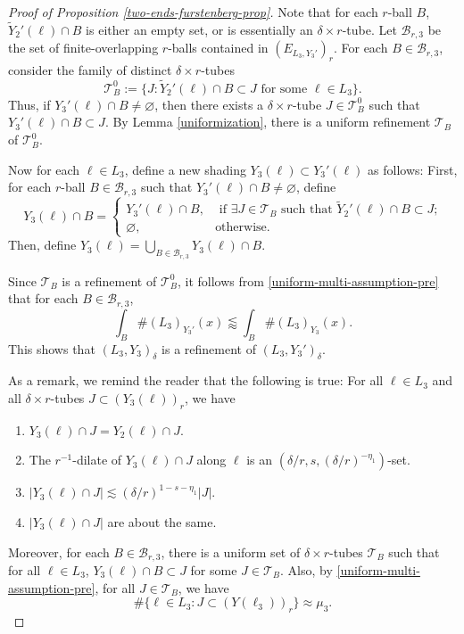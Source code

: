 \documentclass{amsart}
\numberwithin{equation}{section}
\newcommand{\de}{\delta}
\newcommand{\cb}{\mathcal B}
\newcommand{\cT}{{\mathcal T}}
\begin{document}
\begin{proof}[Proof of Proposition \ref{two-ends-furstenberg-prop}]
\smallskip

Note that for each $r$-ball $B$, $\tilde Y_2'(\ell)\cap B$ is either an empty set, or is essentially an $\de\times r$-tube.
Let $\cb_{r,3}$ be the set of finite-overlapping $r$-balls contained in $(E_{L_3, Y_3'})_r$.  
For each $B\in\cb_{r,3}$, consider the family of distinct  $\de\times r$-tubes 
\begin{equation}
    \cT_B^0:=\{J: \tilde Y_2'(\ell)\cap B\subset J\text{ for some $\ell\in L_3$}\}.
\end{equation}
Thus, if $Y_3'(\ell)\cap B\not=\varnothing$, then there exists a $\de\times r$-tube $J\in\cT_B^0$ such that $Y_3'(\ell)\cap B\subset J$.
By Lemma \ref{uniformization}, there is a uniform refinement $\cT_B$ of $\cT_B^0$. 


Now for each $\ell\in L_3$, define a new shading $Y_3(\ell)\subset Y_3'(\ell)$ as follows: 
First, for each $r$-ball $B\in\cb_{r,3}$ such that $Y_3'(\ell)\cap B\not=\varnothing$, define
\begin{equation}
    Y_3(\ell)\cap B=\left\{\begin{array}{cc}
    Y_3'(\ell)\cap B,  & \text{ if $\exists J\in\cT_B$ such that $\tilde Y_2'(\ell)\cap B\subset J$;} \\
    \varnothing,   & \text{otherwise}.
    \end{array}\right.
\end{equation}
Then, define $Y_3(\ell)=\bigcup_{B\in\cb_{r,3}}Y_3(\ell)\cap B$.



Since $\cT_B$ is a refinement of $\cT_B^0$, it follows from  \eqref{uniform-multi-assumption-pre} that for each $B\in\cb_{r,3}$,
\begin{equation}
    \int_B \#(L_3)_{Y_3'}(x)\lessapprox\int_B \#(L_3)_{Y_3}(x).
\end{equation}
This shows that $(L_3, Y_3)_\de$ is a refinement of $(L_3, Y_3')_\de$. 

\smallskip


As a remark, we remind the reader that the following is true:
For all $\ell\in L_3$ and all $\de\times r$-tubes $J\subset (Y_3(\ell))_r$, we have
\begin{enumerate}
    \item $Y_3(\ell)\cap J = Y_2(\ell)\cap J$.
    \item The $r^{-1}$-dilate of $Y_3(\ell)\cap J$ along $\ell$ is an $(\de/r, s, (\de/r)^{-\eta_1})$-set.
    \item $|Y_3(\ell)\cap J|\lesssim (\de/r)^{1-s-\eta_1}|J|$.
    \item $|Y_3(\ell)\cap J|$ are about the same.
\end{enumerate}
Moreover, for each $B\in\cb_{r,3}$, there is a uniform set of $\de\times r$-tubes $\cT_B$ such that for all $\ell\in L_3$, $Y_3(\ell)\cap B\subset J$ for some $J\in\cT_B$.
Also, by \eqref{uniform-multi-assumption-pre}, for all $J\in\cT_B$, we have
\begin{equation}
\label{uniform-multi-assumption}
    \#\{\ell\in L_3:  J\subset (Y(\ell_3))_r\}\approx\mu_3.
\end{equation}


\end{proof}
\end{document}
